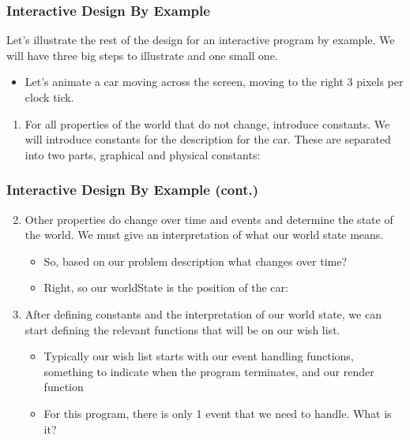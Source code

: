 \documentclass{beamer}
\begin{document}

\begin{frame}
  \frametitle{Interactive Design By Example}
  Let's illustrate the rest of the design for an interactive program by example.
  We will have three big steps to illustrate and one small one.
  \begin{itemize}
  \item<2-> Let's animate a car moving across the screen, moving to the right 3 pixels per clock tick. 
  \end{itemize}
  \begin{enumerate}
  \item<3-> For all properties of the world that do not change, introduce constants.
    We will introduce constants for the description for the car. These are separated into two parts, graphical and physical constants:
    \constants
  \end{enumerate}
\end{frame}

\begin{frame}
  \frametitle{Interactive Design By Example (cont.)}
  \begin{enumerate}
    \setcounter{enumi}{1}
  \item<1-> Other properties do change over time and events and determine the state of the world. We must give an interpretation of what our world state means.
    \begin{itemize}
    \item<2-> So, based on our problem description what changes over time?
    \item<3-> Right, so our worldState is the position of the car:
      \worldState
    \end{itemize}
  \item<4-> After defining constants and the interpretation of our world state,
    we can start defining the relevant functions that will be on our wish list.
    \begin{itemize}
    \item<5-> Typically our wish list starts with our event handling functions, something to indicate when the program terminates, and our render function
    \item<6-> For this program, there is only 1 event that we need to handle. What is it?
    \end{itemize}
  \end{enumerate}
\end{frame}
\end{document}
